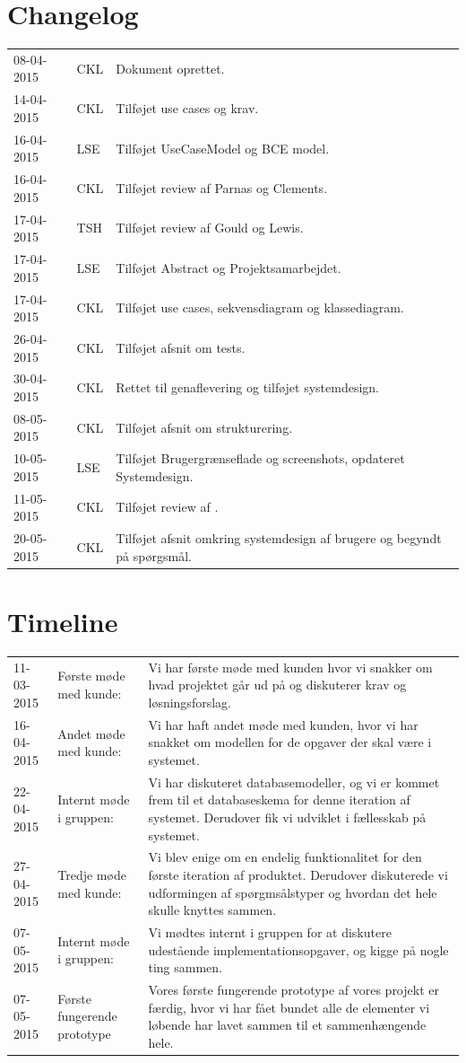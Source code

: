 \documentclass[11pt, a4paper]{article}
\begin{document}
\section{Changelog}
\label{sec:changelog}
\begin{tabular}{l l l}
08-04-2015 & CKL & Dokument oprettet. \\
14-04-2015 & CKL & Tilføjet use cases og krav. \\
16-04-2015 & LSE & Tilføjet UseCaseModel og BCE model. \\
16-04-2015 & CKL & Tilføjet review af Parnas og Clements. \\
17-04-2015 & TSH & Tilføjet review af Gould og Lewis. \\
17-04-2015 & LSE & Tilføjet Abstract og Projektsamarbejdet. \\
17-04-2015 & CKL & Tilføjet use cases, sekvensdiagram og klassediagram. \\
26-04-2015 & CKL & Tilføjet afsnit om tests. \\
30-04-2015 & CKL & Rettet til genaflevering og tilføjet systemdesign. \\
08-05-2015 & CKL & Tilføjet afsnit om strukturering. \\
10-05-2015 & LSE & Tilføjet Brugergrænseflade og screenshots, opdateret Systemdesign. \\
11-05-2015 & CKL & Tilføjet review af \cite{nsbullet}. \\
20-05-2015 & CKL & Tilføjet afsnit omkring systemdesign af brugere og begyndt på spørgsmål. \\
\end{tabular}

\section{Timeline}
\label{sec:timeline}
\begin{tabular}{l l p{8cm}}
11-03-2015 & Første møde med kunde: & Vi har første møde med kunden hvor vi snakker om hvad projektet går ud på og diskuterer krav og løsningsforslag. \\
16-04-2015 & Andet møde med kunde: & Vi har haft andet møde med kunden, hvor vi har snakket om modellen for de opgaver der skal være i systemet. \\
22-04-2015 & Internt møde i gruppen: & Vi har diskuteret databasemodeller, og vi er kommet frem til et databaseskema for denne iteration af systemet. Derudover fik vi udviklet i fællesskab på systemet. \\
27-04-2015 & Tredje møde med kunde: & Vi blev enige om en endelig funktionalitet for den første iteration af produktet. Derudover diskuterede vi udformingen af spørgmsålstyper og hvordan det hele skulle knyttes sammen. \\
07-05-2015 & Internt møde i gruppen: & Vi mødtes internt i gruppen for at diskutere udestående implementationsopgaver, og kigge på nogle ting sammen. \\
07-05-2015 & Første fungerende prototype & Vores første fungerende prototype af vores projekt er færdig, hvor vi har fået bundet alle de elementer vi løbende har lavet sammen til et sammenhængende hele. \\
\end{tabular}
\end{document}
